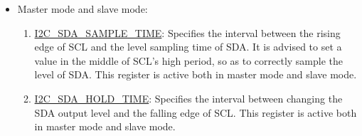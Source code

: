 \documentclass[main\_\_EN.tex]{subfiles}
\begin{document}
\begin{itemize}
\begin{enumerate}
In the above formula, 3 represents the number of clock cycles required to synchronize the SCL. If the SCL filtering function is turned on, the delay caused by  \hyperref[fielddesc:I2CSCLFILTERTHRES]{I2C\_SCL\_FILTER\_THRES} needs to be added. The SCL low-to-high transition time is represented by \hyperref[fielddesc:I2CSCLWAITHIGHPERIOD]{I2C\_SCL\_WAIT\_HIGH\_PERIOD} + 1 module clock. This transition time can be affected by factors such as the pull-up resistor, IO drive capability, and SCL line capacitance. As a result, a deviation may occur between the actual frequency of the test and the theoretical frequency. At this point, deviations can be reduced by adjusting the value of \hyperref[fielddesc:I2CSCLWAITHIGHPERIOD]{I2C\_SCL\_WAIT\_HIGH\_PERIOD}.
\end{enumerate}

\item Master mode and slave mode:

\begin{enumerate}

\item \hyperref[fielddesc:I2CSDASAMPLETIME]{I2C\_SDA\_SAMPLE\_TIME}:
Specifies the interval between the rising edge of SCL and the level sampling time of SDA. It is advised to set a value in the middle of SCL's high period, so as to correctly sample the level of SDA. This register is active both in master mode and slave mode.

\item \hyperref[fielddesc:I2CSDAHOLDTIME]{I2C\_SDA\_HOLD\_TIME}:
Specifies the interval between changing the SDA output level and the falling edge of SCL. This register is active both in master mode and slave mode.

\end{enumerate}

\end{itemize}
\end{document}
